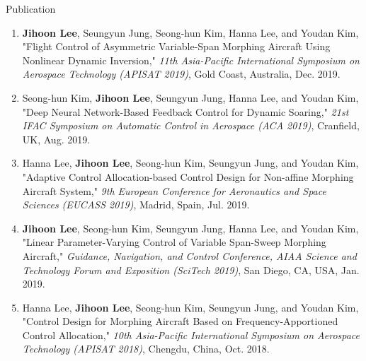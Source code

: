 \documentclass{resume}
\begin{document}
\begin{rSection}{Publication}
\begin{enumerate}
		\item \textbf{Jihoon Lee}, Seungyun Jung, Seong-hun Kim, Hanna Lee, and Youdan Kim, "Flight Control of Asymmetric Variable-Span Morphing Aircraft Using Nonlinear Dynamic Inversion," \textit{11th Asia-Pacific International Symposium on Aerospace Technology (APISAT 2019)}, Gold Coast, Australia, Dec. 2019. 
		\newline[\href{https://search.informit.com.au/documentSummary;dn=942442757619423;res=IELENG}{Link}] 
	
		\item Seong-hun Kim, \textbf{Jihoon Lee}, Seungyun Jung, Hanna Lee, and Youdan Kim, "Deep Neural Network-Based Feedback Control for Dynamic Soaring," \textit{21st IFAC Symposium on Automatic Control in Aerospace (ACA 2019)}, Cranfield, UK, Aug. 2019. 
		
		\item Hanna Lee, \textbf{Jihoon Lee}, Seong-hun Kim, Seungyun Jung, and Youdan Kim, "Adaptive Control Allocation-based Control Design for Non-affine Morphing Aircraft System," \textit{9th European Conference for Aeronautics and Space Sciences (EUCASS 2019)}, Madrid, Spain, Jul. 2019. 
		
		\item \textbf{Jihoon Lee}, Seong-hun Kim, Seungyun Jung, Hanna Lee, and Youdan Kim, "Linear Parameter-Varying Control of Variable Span-Sweep Morphing Aircraft," \textit{Guidance, Navigation, and Control Conference, AIAA Science and Technology Forum and Exposition (SciTech 2019)}, San Diego, CA, USA, Jan. 2019. 
		
		\item Hanna Lee, \textbf{Jihoon Lee}, Seong-hun Kim, Seungyun Jung, and Youdan Kim, "Control Design for Morphing Aircraft Based on Frequency-Apportioned Control Allocation," \textit{10th Asia-Pacific International Symposium on Aerospace Technology (APISAT 2018)}, Chengdu, China, Oct. 2018. 
		

\end{enumerate}
\end{rSection}
\end{document}
